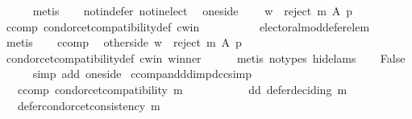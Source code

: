 \begin{isabellebody}
\ \ \ \ \isamarkupfalse%
\ metis\isanewline
\ \ \isamarkupfalse%
\ not{\isacharunderscore}{\kern0pt}in{\isacharunderscore}{\kern0pt}defer\ not{\isacharunderscore}{\kern0pt}in{\isacharunderscore}{\kern0pt}elect\ \isamarkupfalse%
\ one{\isacharunderscore}{\kern0pt}side{\isacharcolon}{\kern0pt}\isanewline
\ \ \ \ {\isachardoublequoteopen}w\ {\isasymin}\ reject\ m\ A\ p{\isachardoublequoteclose}\isanewline
\ \ \ \ \isamarkupfalse%
\ ccomp\ condorcet{\isacharunderscore}{\kern0pt}compatibility{\isacharunderscore}{\kern0pt}def\ c{\isacharunderscore}{\kern0pt}win\isanewline
\ \ \ \ \ \ \ \ \ \ electoral{\isacharunderscore}{\kern0pt}mod{\isacharunderscore}{\kern0pt}defer{\isacharunderscore}{\kern0pt}elem\isanewline
\ \ \ \ \isamarkupfalse%
\ metis\isanewline
\ \ \isamarkupfalse%
\ ccomp\ \isamarkupfalse%
\ other{\isacharunderscore}{\kern0pt}side{\isacharcolon}{\kern0pt}\ {\isachardoublequoteopen}w\ {\isasymnotin}\ reject\ m\ A\ p{\isachardoublequoteclose}\isanewline
\ \ \ \ \isamarkupfalse%
\ condorcet{\isacharunderscore}{\kern0pt}compatibility{\isacharunderscore}{\kern0pt}def\ c{\isacharunderscore}{\kern0pt}win\ winner\isanewline
\ \ \ \ \isamarkupfalse%
\ {\isacharparenleft}{\kern0pt}metis\ {\isacharparenleft}{\kern0pt}no{\isacharunderscore}{\kern0pt}types{\isacharcomma}{\kern0pt}\ hide{\isacharunderscore}{\kern0pt}lams{\isacharparenright}{\kern0pt}{\isacharparenright}{\kern0pt}\isanewline
\ \ \isamarkupfalse%
\ False\isanewline
\ \ \ \ \isamarkupfalse%
\ {\isacharparenleft}{\kern0pt}simp\ add{\isacharcolon}{\kern0pt}\ one{\isacharunderscore}{\kern0pt}side{\isacharparenright}{\kern0pt}\isanewline
{}\isamarkupfalse%
%
\endisatagproof
{\isafoldproof}%
%
\isadelimproof
\isanewline
%
\endisadelimproof
\isanewline
{}\isamarkupfalse%
\ ccomp{\isacharunderscore}{\kern0pt}and{\isacharunderscore}{\kern0pt}dd{\isacharunderscore}{\kern0pt}imp{\isacharunderscore}{\kern0pt}dcc{\isacharbrackleft}{\kern0pt}simp{\isacharbrackright}{\kern0pt}{\isacharcolon}{\kern0pt}\isanewline
\ \ \ ccomp{\isacharcolon}{\kern0pt}\ {\isachardoublequoteopen}condorcet{\isacharunderscore}{\kern0pt}compatibility\ m{\isachardoublequoteclose}\ \isanewline
\ \ \ \ \ \ \ \ \ \ dd{\isacharcolon}{\kern0pt}\ {\isachardoublequoteopen}defer{\isacharunderscore}{\kern0pt}deciding\ m{\isachardoublequoteclose}\isanewline
\ \ \ {\isachardoublequoteopen}defer{\isacharunderscore}{\kern0pt}condorcet{\isacharunderscore}{\kern0pt}consistency\ m{\isachardoublequoteclose}\isanewline

\end{isabellebody}
